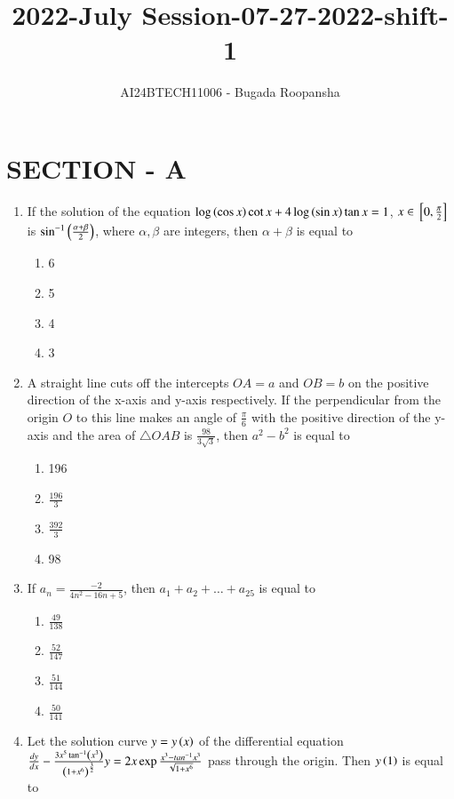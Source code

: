 \documentclass[journal,12pt,twocolumn]{IEEEtran}
\theoremstyle{remark}
\begin{document}

\vspace{3cm}
\title{2022-July Session-07-27-2022-shift-1}
\author{AI24BTECH11006 - Bugada Roopansha}
\maketitle
\section{SECTION - A}
\begin{enumerate}[start=16]
\item If the solution of the equation $\log\left(\cos{x}\right)\cot{x} + 4\log\left(\sin{x}\right)\tan{x} = 1$, $x \in {}\left[0, \frac{\pi}{2}\right]$ is $\sin^{-1}\left(\frac{\alpha + \beta}{2}\right)$, where $\alpha, \beta$ are integers, then $\alpha + \beta$ is equal to 
    \begin{enumerate}
    \item 6
        \item 5
        \item 4
        \item 3
    \end{enumerate}
\item A straight line cuts off the intercepts $OA = a$ and $OB = b$ on the positive direction of the x-axis and y-axis respectively. If the perpendicular from the origin $O$ to this line makes an angle of $\frac{\pi}{6}$ with the positive direction of the y-axis and the area of $\triangle OAB$ is $\frac{98}{3\sqrt{3}}$, then $a^2 - b^2$ is equal to 
    \begin{enumerate}
        \item 196
        \item $\frac{196}{3}$
        \item $\frac{392}{3}$
        \item 98
    \end{enumerate}
\item If $a_n=\frac{-2}{4n^2 - 16n + 5}$, then $a_1 + a_2 + \dots + a_{25}$ is equal to 
    \begin{enumerate}
        \item $\frac{49}{138}$
        \item $\frac{52}{147}$
        \item $\frac{51}{144}$
        \item $\frac{50}{141}$
    \end{enumerate}
\item Let the solution curve $y = y\left(x\right)$ of the differential equation $\frac{dy}{dx} - \frac{3 x^5 \tan^{-1}\left(x^3\right)}{\left(1+x^6\right)^\frac{3}{2}}y=2x\exp{\frac{x^3-tan^{-1} x^3}{\sqrt{1+x^6}}}$ pass through the origin. Then  $y\left(1\right)$ is equal to 

\end{enumerate}
\end{document}
